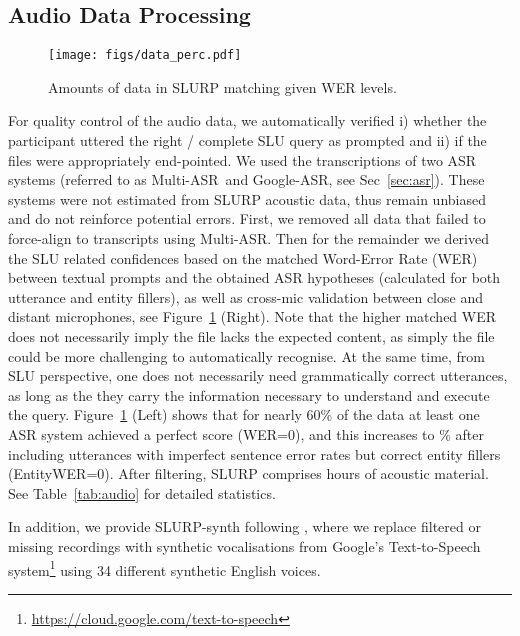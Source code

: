 \documentclass[11pt,a4paper]{article}
\newcommand{\datasetacr}{SLURP}
\newcommand{\slu}{SLU}
\newcommand{\asr}{ASR}
\newcommand{\wer}{WER}
\newcommand{\gasr}{Google-ASR}
\newcommand{\masr}{Multi-ASR}
\begin{document}
\subsection{Audio Data Processing}
\begin{figure}
\centering
\texttt{[image: figs/data\_perc.pdf]}
\caption{Amounts of data in \datasetacr{} matching given \wer{} levels.} \label{fig:audio_sel}
\end{figure}
For quality control of the audio data, we automatically verified i) whether the participant uttered the right / complete \slu{} query as prompted and ii) if the files were appropriately end-pointed.  
We used the transcriptions of
two \asr{} systems (referred to as \masr~and \gasr, see Sec~\ref{sec:asr}). These systems were not estimated from \datasetacr{} acoustic data, thus remain unbiased and do not reinforce potential errors. First, we removed all data that failed to force-align to transcripts using \masr. Then for the remainder we derived the \slu{} related confidences based on the matched Word-Error Rate (\wer) between textual prompts and the obtained \asr{} hypotheses (calculated for both utterance and entity fillers), as well as cross-mic validation between close and distant microphones, see Figure~\ref{fig:audio_sel} (Right). Note that the higher matched \wer{} does not necessarily imply the file lacks the expected content, as simply the file could be more challenging to automatically recognise. At the same time, from \slu{} perspective, one does not necessarily need grammatically correct utterances, as long as the they carry the information necessary to understand and execute the query.
Figure~\ref{fig:audio_sel} (Left) shows that for nearly 60\% of the data at least one ASR system achieved a perfect score (\wer=0), and this increases to \% after including utterances with imperfect sentence error rates but correct entity fillers (EntityWER=0). 
After filtering, \datasetacr{} comprises  hours of acoustic material.  
See Table~\ref{tab:audio} for detailed statistics.

In addition, we provide \datasetacr-synth following  \cite{arxiv.org/abs/1910.09463}, where we replace filtered or missing recordings with synthetic vocalisations from Google's Text-to-Speech 
system\footnote{\url{https://cloud.google.com/text-to-speech}} using 34 different synthetic English voices. 
\end{document}

